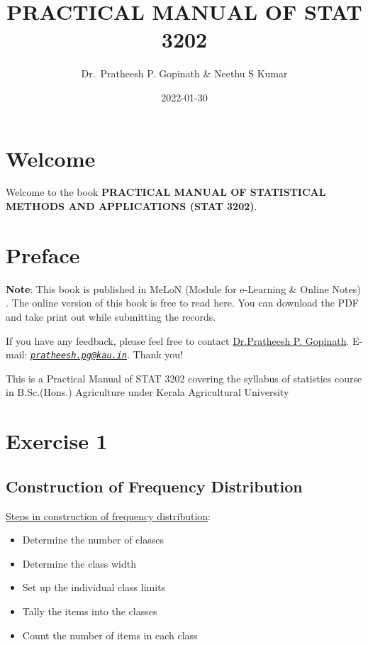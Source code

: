\documentclass[
]{book}
\title{PRACTICAL MANUAL OF STAT 3202}
\author{Dr.~Pratheesh P. Gopinath \& Neethu S Kumar}
\date{2022-01-30}
\providecommand{\tightlist}{%
  \setlength{\itemsep}{0pt}\setlength{\parskip}{0pt}}
\begin{document}
\maketitle

{
\setcounter{tocdepth}{1}
\tableofcontents
}
\hypertarget{welcome}{%
\chapter*{Welcome}\label{welcome}}

Welcome to the book \textbf{PRACTICAL MANUAL OF STATISTICAL METHODS AND APPLICATIONS (STAT 3202)}.

\hypertarget{preface}{%
\chapter*{Preface}\label{preface}}

\textbf{Note}: This book is published in MeLoN (Module for e-Learning \& Online Notes) . The online version of this book is free to read here. You can download the PDF and take print out while submitting the records.

If you have any feedback, please feel free to contact \href{https://coavellayani.kau.in/people/dr-pratheesh-p-gopinath}{Dr.Pratheesh P. Gopinath}. E-mail: \emph{\href{mailto:pratheesh.pg@kau.in}{\nolinkurl{pratheesh.pg@kau.in}}}. Thank you!

This is a Practical Manual of STAT 3202 covering the syllabus of statistics course in B.Sc.(Hons.) Agriculture under Kerala Agricultural University

\hypertarget{exercise-1}{%
\chapter{Exercise 1}\label{exercise-1}}

\hypertarget{construction-of-frequency-distribution}{%
\section{Construction of Frequency Distribution}\label{construction-of-frequency-distribution}}

\underline{Steps in construction of frequency distribution}:

\begin{itemize}
\tightlist
\item
  Determine the number of classes\\
\item
  Determine the class width\\
\item
  Set up the individual class limits\\
\item
  Tally the items into the classes\\
\item
  Count the number of items in each class
\end{itemize}
\end{document}

